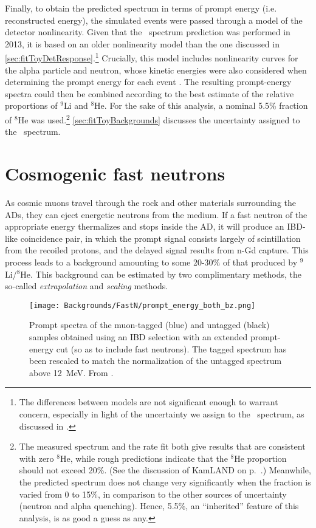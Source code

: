 \documentclass[../thesis.tex]{subfiles}
\begin{document}
Finally, to obtain the predicted spectrum in terms of prompt energy (i.e. reconstructed energy), the simulated events were passed through a model of the detector nonlinearity. Given that the \LiHe\ spectrum prediction was performed in 2013, it is based on an older nonlinearity model than the one discussed in \autoref{sec:fitToyDetResponse}.\footnote{The differences between models are not significant enough to warrant concern, especially in light of the uncertainty we assign to the \LiHe\ spectrum, as discussed in \cite{berkeley_toymc}.} Crucially, this model includes nonlinearity curves for the alpha particle and neutron, whose kinetic energies were also considered when determining the prompt energy for each event \cite{bcwNonlin}. The resulting prompt-energy spectra could then be combined according to the best estimate of the relative proportions of $^9$Li and $^8$He. For the sake of this analysis, a nominal 5.5\% fraction of $^8$He was used.\footnote{The measured spectrum and the rate fit both give results that are consistent with zero $^8$He, while rough predictions indicate that the $^8$He proportion should not exceed 20\%. (See the discussion of KamLAND on p.~\pageref{par:kamland_he8}.) Meanwhile, the predicted spectrum does not change very significantly when the fraction is varied from 0 to 15\%, in comparison to the other sources of uncertainty (neutron and alpha quenching). Hence, 5.5\%, an ``inherited'' feature of this analysis, is as good a guess as any.} \autoref{sec:fitToyBackgrounds} discusses the uncertainty assigned to the \LiHe\ spectrum.

\section{Cosmogenic fast neutrons}
\label{sec:bkgFastnOverview}

As cosmic muons travel through the rock and other materials surrounding the ADs, they can eject energetic neutrons from the medium. If a fast neutron of the appropriate energy thermalizes and stops inside the AD, it will produce an IBD-like coincidence pair, in which the prompt signal consists largely of scintillation from the recoiled protons, and the delayed signal results from n-Gd capture. This process leads to a background amounting to some 20-30\% of that produced by $^9$Li/$^8$He. This background can be estimated by two complimentary methods, the so-called \emph{extrapolation} and \emph{scaling} methods.

\begin{figure}[h!]
  \texttt{[image: Backgrounds/FastN/prompt\_energy\_both\_bz.png]}
  \caption{Prompt spectra of the muon-tagged (blue) and untagged (black) samples obtained using an IBD selection with an extended prompt-energy cut (so as to include fast neutrons). The tagged spectrum has been rescaled to match the normalization of the untagged spectrum above 12~MeV. From \cite{fastn}.}
  \label{fig:fastn_prompt_energy_both_bzOverview}
\end{figure}
\end{document}
